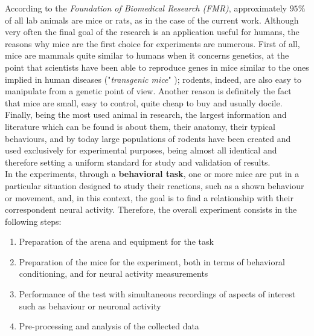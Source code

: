 \documentclass[12pt, a4paper]{report}
\begin{document}
According to the \textit{Foundation of Biomedical Research (FMR)}, approximately $95\% $ of all lab animals are mice or rats, as in the case of the current work. Although very often the final goal of the research is an application useful for humans, the reasons why mice are the first choice for experiments are numerous. First of all, mice are mammals quite similar to humans when it concerns genetics, at the point that scientists have been able to reproduce genes in mice similar to the ones implied in human diseases ("\textit{transgenic mice}" \cite{7}); %
 rodents, indeed, are also easy to manipulate from a genetic point of view. Another reason is definitely the fact that mice are small, easy to control, quite cheap to buy and usually docile. Finally, being the most used animal in research, the largest information and literature which can be found is about them, their anatomy, their typical behaviours, and by today large populations of rodents have been created and used exclusively for experimental purposes, being almost all identical and therefore setting a uniform standard for study and validation of results. \\
In the experiments, through a  \textbf{behavioral task}, one or more mice are put in a particular situation designed to study their reactions, such as a shown behaviour or movement, and, in this context, the goal is to find a relationship with their correspondent neural activity. Therefore, the overall experiment consists in the following steps:
\begin{enumerate}
	\item Preparation of the arena and equipment for the task 
	\item Preparation of the mice for the experiment, both in terms of behavioral conditioning, and for neural activity measurements
	\item Performance of the test with simultaneous recordings of  aspects of interest such as behaviour or neuronal activity
	\item Pre-processing and analysis of the collected data
\end{enumerate}
\end{document}
